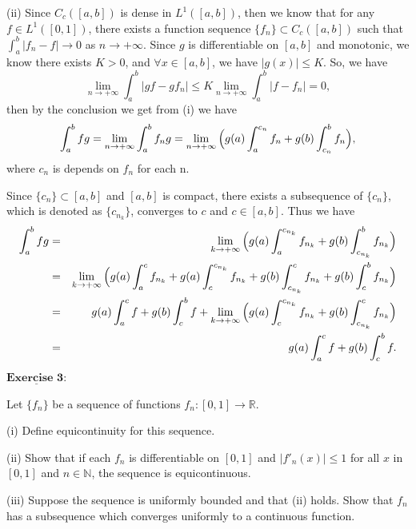 \documentclass[12pt,a4paper]{ctexart}
\begin{document}
(ii) Since $C_{c}([a, b])$ is dense in $L^{1}([a, b])$, then we know that for any $f \in L^{1}([0, 1])$, there exists a function sequence $\{f_{n}\} \subset C_{c}([a, b])$ such that $\int_{a}^{b} |f_{n} - f| \to 0$ as $n \to + \infty$.
Since $g$ is differentiable on $[a,b]$ and monotonic, we know there exists $K > 0$, and $\forall x \in [a, b]$, we have $|g(x)| \leq K$. So, we have
\begin{equation*}
   \lim_{n \to + \infty} \int_{a}^{b} |g f - g f_{n}| \leq K \lim_{n \to + \infty} \int_{a}^{b}|f - f_{n}| = 0,
\end{equation*}
then by the conclusion we get from (i) we have
\begin{equation*}
   \int_{a}^{b} f g = \lim_{n \to + \infty} \int_{a}^{b} f_{n} g = \lim_{n \to + \infty} \Big{(} g(a) \int_{a}^{c_{n}} f_{n} + g(b) \int_{c_{n}}^{b} f_{n} \Big{)},
\end{equation*}
where $c_{n}$ is depends on $f_{n}$ for each n.

Since $\{c_{n}\} \subset [a, b]$ and $[a, b]$ is compact, there exists a subsequence of $\{c_{n}\}$, which is denoted as $\{c_{n_{k}}\}$, converges to $c$ and $c \in [a, b]$. Thus we have
\begin{eqnarray*}
\int_{a}^{b} f g & = & \lim_{k \to + \infty} \Big{(} g(a) \int_{a}^{c_{n_{k}}} f_{n_{k}} + g(b) \int_{c_{n_{k}}}^{b} f_{n_{k}} \Big{)} \\
& = & \lim_{k \to + \infty} \Big{(} g(a) \int_{a}^{c} f_{n_{k}} + g(a) \int_{c}^{c_{n_{k}}} f_{n_{k}} + g(b) \int_{c_{n_{k}}}^{c} f_{n_{k}} + g(b) \int_{c}^{b} f_{n_{k}} \Big{)} \\
& = &  g(a) \int_{a}^{c} f + g(b) \int_{c}^{b} f + \lim_{k \to + \infty} \Big{(} g(a) \int_{c}^{c_{n_{k}}} f_{n_{k}} +  g(b) \int_{c_{n_{k}}}^{c} f_{n_{k}} \Big{)} \\
& = & g(a) \int_{a}^{c} f + g(b) \int_{c}^{b} f.
\end{eqnarray*}

\newpage

$\underline{\textbf{Exercise 3:}}$


Let $\{f_{n}\}$ be a sequence of functions $f_{n}: [0, 1] \rightarrow \mathbb{R}$.

(i) Define equicontinuity for this sequence.

(ii) Show that if each $f_{n}$ is differentiable on $[0, 1]$ and $|f'_{n}(x)| \leq 1$ for all $x$ in $[0, 1]$ and $n \in \mathbb{N}$, the sequence is equicontinuous.

(iii) Suppose the sequence is uniformly bounded and that (ii) holds. Show that $f_{n}$ has a subsequence which converges uniformly to a continuous function.
\end{document}
